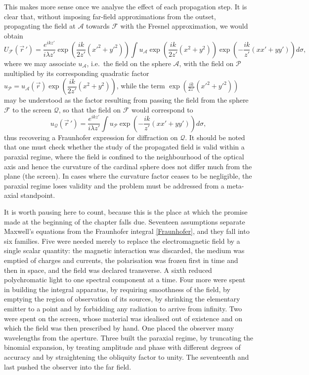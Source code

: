 This makes more sense once we analyse the effect of each propagation step. It is clear that, without imposing far-field approximations from the outset, propagating the field at $\mathcal{A}$ towards $\mathcal{F}$ with the Fresnel approximation, we would obtain
\begin{equation}
	U_{\mathcal{F}}(\vec{r}\,') = \dfrac{e^{ikz'}}{i\lambda z'} \exp\left( \frac{ik}{2z'} (x'^2 + y'^2) \right)  \int u_{\mathcal{A}}
	\exp\left( \frac{ik}{2z'} (x^2 + y^2) \right)
	\exp\left( -\frac{ik}{z'} (xx' + yy') \right)d\sigma ,
\end{equation}
where we may associate $u_{\mathcal{A}}$, i.e.\ the field on the sphere $\mathcal{A}$, with the field on $\mathcal{P}$ multiplied by its corresponding quadratic factor $u_{\mathcal{P}} = u_{\mathcal{A}} (\vec{r}) \exp{\left( \dfrac{ik}{2z'}(x^2+y^2) \right)}$, while the term $\exp{\left( \frac{ik}{2z'} (x'^2 + y'^2) \right)}$ may be understood as the factor resulting from passing the field from the sphere $\mathcal{F}$ to the screen $\mathcal{Q}$, so that the field on $\mathcal{F}$ would correspond to
\begin{equation}
	u_{\mathcal{Q}}(\vec{r}\,') = \dfrac{e^{ikz'}}{i\lambda z'} \int u_{\mathcal{P}}
	\exp\left( -\frac{ik}{z'} (xx' + yy') \right)d\sigma ,
\end{equation}
thus recovering a Fraunhofer expression for diffraction on $\mathcal{Q}$. It should be noted that one must check whether the study of the propagated field is valid within a paraxial regime, where the field is confined to the neighbourhood of the optical axis and hence the curvature of the cardinal sphere does not differ much from the plane (the screen). In cases where the curvature factor ceases to be negligible, the paraxial regime loses validity and the problem must be addressed from a meta-axial standpoint.

It is worth pausing here to count, because this is the place at which the promise made at the beginning of the chapter falls due. Seventeen assumptions separate Maxwell's equations from the Fraunhofer integral \eqref{Fraunhofer}, and they fall into six families. Five were needed merely to replace the electromagnetic field by a single scalar quantity: the magnetic interaction was discarded, the medium was emptied of charges and currents, the polarisation was frozen first in time and then in space, and the field was declared transverse. A sixth reduced polychromatic light to one spectral component at a time. Four more were spent in building the integral apparatus, by requiring smoothness of the field, by emptying the region of observation of its sources, by shrinking the elementary emitter to a point and by forbidding any radiation to arrive from infinity. Two were spent on the screen, whose material was idealised out of existence and on which the field was then prescribed by hand. One placed the observer many wavelengths from the aperture. Three built the paraxial regime, by truncating the binomial expansion, by treating amplitude and phase with different degrees of accuracy and by straightening the obliquity factor to unity. The seventeenth and last pushed the observer into the far field.

